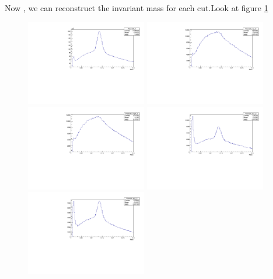 \documentclass{article}
\begin{document}
Now , we can reconstruct the invariant mass for each cut.Look at figure \ref{invmasscuts}
\begin{figure}
\includegraphics[width=0.47\textwidth]{fig_pi0vn/cut1_sect2allruns.pdf}
\includegraphics[width=0.47\textwidth]{fig_pi0vn/cut2_sect2allruns.pdf}
\includegraphics[width=0.47\textwidth]{fig_pi0vn/cut3_sect2allruns.pdf}
\includegraphics[width=0.47\textwidth]{fig_pi0vn/cut4_sect2allruns.pdf}
\includegraphics[width=0.47\textwidth]{fig_pi0vn/cut5_sect2allruns.pdf}
\label{invmasscuts}
\caption{}
\end{figure}
\end{document}
